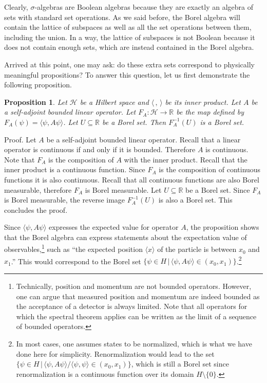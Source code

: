 \documentclass[11pt, executivepaper]{article}
\newtheorem{prop}{Proposition}
\begin{document}
Clearly, $\sigma$-algebras are Boolean algebras because they are exactly an algebra of sets with standard set operations. As we said before, the Borel algebra will contain the lattice of subspaces as well as all the set operations between them, including the union. In a way, the lattice of subspaces is not Boolean because it does not contain enough sets, which are instead contained in the Borel algebra.

Arrived at this point, one may ask: do these extra sets correspond to physically meaningful propositions? To answer this question, let us first demonstrate the following proposition.

\begin{prop}
	Let $\mathcal{H}$ be a Hilbert space and $\langle \, , \, \rangle$ be its inner product. Let $A$ be a self-adjoint bounded linear operator. Let $F_A : \mathcal{H} \to \mathbb{R}$ be the map defined by $F_A(\psi) = \langle \psi , A \psi \rangle$. Let $U \subseteq \mathbb{R}$ be a Borel set. Then $F_A^{-1}(U)$ is a Borel set.
\end{prop}

Proof. Let $A$ be a self-adjoint bounded linear operator. Recall that a linear operator is continuous if and only if it is bounded. Therefore $A$ is continuous. Note that $F_A$ is the composition of $A$ with the inner product. Recall that the inner product is a continuous function. Since $F_A$ is the composition of continuous functions it is also continuous. Recall that all continuous functions are also Borel measurable, therefore $F_A$ is Borel measurable. Let $U \subseteq \mathbb{R}$ be a Borel set. Since $F_A$ is Borel measurable, the reverse image $F_A^{-1}(U)$ is also a Borel set. This concludes the proof.

Since $\langle \psi , A \psi \rangle$ expresses the expected value for operator $A$, the proposition shows that the Borel algebra can express statements about the expectation value of observables,\footnote{Technically, position and momentum are not bounded operators. However, one can argue that measured position and momentum are indeed bounded as the acceptance of a detector is always limited. Note that all operators for which the spectral theorem applies can be written as the limit of a sequence of bounded operators.} such as ``the expected position $\langle x \rangle$ of the particle is between $x_0$ and $x_1$.'' This would correspond to the Borel set $\{ \psi \in H \, | \, \langle \psi , A \psi \rangle \in (x_0, x_1) \}$.\footnote{In most cases, one assumes states to be normalized, which is what we have done here for simplicity. Renormalization would lead to the set $\{ \psi \in H \, | \, \langle \psi , A \psi \rangle / \langle \psi , \psi \rangle \in (x_0, x_1) \}$, which is still a Borel set since renormalization is a continuous function over its domain $H \setminus \{ 0 \}$.}
\end{document}
